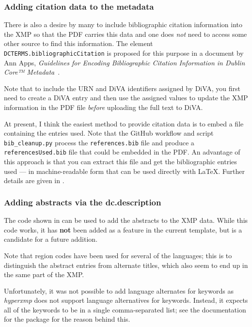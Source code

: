 \documentclass[12pt, twoside]{article}
\newcommand{\fname}[1]{\texttt{#1}}
\begin{document}
\subsubsection{Adding citation data to the metadata}
\label{sec:addingCitation}
There is also a desire by many to include bibliographic citation information into the \gls{XMP} so that the \gls{PDF} carries this data and one does \emph{not} need to access some other source to find this information. The element \texttt{DCTERMS.bibliographicCitation} is proposed for this purpose in a document by Ann Apps, \textit{Guidelines for Encoding Bibliographic Citation Information in Dublin Core™ Metadata}~\cite{Ann_Apps_2005}.

Note that to include the \gls{URN} and \gls{DiVA} identifiers assigned by \gls{DiVA}, you first need to create a \gls{DiVA} entry and then use the assigned values to update the \gls{XMP} information in the \gls{PDF} file \textit{before} uploading the full text to \gls{DiVA}.

At present, I think the easiest method to provide citation data is to embed a file containing the \BibLaTeX{} entries used. Note that the GitHub workflow and script \fname{bib\_cleanup.py} process the \fname{references.bib} file and produce a \fname{referencesUsed.bib} file that could be embedded in the \gls{PDF}. An advantage of this approach is that you can extract this file and get the bibliographic entries used --- in machine-readable form that can be used directly with \LaTeX. Further details are given in .

\subsubsection{Adding abstracts via the dc.description}
\label{sec:addingAbstractsInXMP}
The code shown in  can be used to add the abstracts to the \gls{XMP} data. While this code works, it has \textbf{not} been added as a feature in the current template, but is a candidate for a future addition.

Note that region codes have been used for several of the languages; this is to distinguish the abstract entries from alternate titles, which also seem to end up in the same part of the XMP.

Unfortunately, it was not possible to add language alternates for keywords as \textit{hyperxmp} does not support language alternatives for keywords. Instead, it expects all of the keywords to be in a single comma-separated list; see the documentation for the package for the reason behind this.
\end{document}
